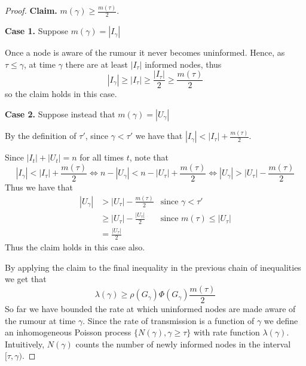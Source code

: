 \begin{proof}
	\textbf{Claim.} $m(\gamma) \geq \frac{m(\tau)}{2}$. %

	\textbf{Case 1.} Suppose $m(\gamma) = |I_\gamma|$

	\noindent
	Once a node is aware of the rumour it never becomes uninformed. Hence, as $\tau \leq \gamma$, at time $\gamma$ there are at least $|I_\tau|$ informed nodes, thus 
	$$
	|I_\gamma| \geq |I_\tau| \geq \frac{|I_\tau|}{2} \geq \frac{m(\tau)}{2}
	$$
	so the claim holds in this case.

	\textbf{Case 2.} Suppose instead that $m(\gamma) = |U_\gamma|$

	\noindent
	By the definition of $\tau'$, since $\gamma < \tau'$ we have that $|I_{\gamma}| < |I_\tau| + \frac{m(\tau)}{2}$.

	Since $|I_t| + |U_t| = n$ for all times $t$, note that
	$$
		|I_{\gamma}| < |I_\tau| + \frac{m(\tau)}{2} 
		\iff
		n - |U_{\gamma}| < n - |U_\tau| + \frac{m(\tau)}{2} 
		\iff
		|U_\gamma| > |U_\tau| - \frac{m(\tau)}{2}
	$$
	Thus we have that
	\begin{align*}
		|U_\gamma| & > |U_\tau| - \frac{m(\tau)}{2} & \text{since }\gamma < \tau' \\
		& \geq |U_\tau| - \frac{|U_\tau|}{2} & \text{since } m(\tau) \leq |U_\tau| \\
		& = \frac{|U_\tau|}{2} 
	\end{align*}
	Thus the claim holds in this case also.
	
	\noindent
	By applying the claim to the final inequality in the previous chain of inequalities we get that
	\begin{equation} \label{eq:RateBound}
		\lambda(\gamma) \geq \rho(G_\gamma)\Phi(G_\gamma)\frac{m(\tau)}{2}
	\end{equation}
	So far we have bounded the rate at which uninformed nodes are made aware of the rumour at time $\gamma$. Since the rate of transmission is a function of $\gamma$ we define an inhomogeneous Poisson process $\{N(\gamma), \gamma \geq \tau\}$ with rate function $\lambda(\gamma)$. %
	Intuitively, $N(\gamma)$ counts the number of newly informed nodes in the interval $[\tau,\gamma)$. %


\end{proof}
